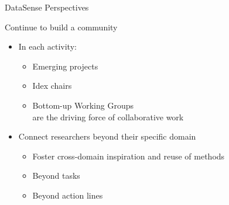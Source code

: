 \begin{frame}{DataSense Perspectives}

{Continue to build a community}
\begin{itemize}
\item In each activity:
\begin{itemize}
\item Emerging projects
\item Idex chairs
\item Bottom-up Working Groups\\
  are the driving force of collaborative work
\end{itemize}

\item 
Connect researchers beyond their specific domain

\begin{itemize}
\item Foster cross-domain inspiration and reuse of methods
\item Beyond tasks
\item Beyond action lines
\end{itemize}
\end{itemize}
\end{frame}



